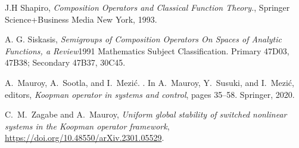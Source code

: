 \documentclass{article}
\begin{document}
\begin{thebibliography}{99}
 J.H Shapiro, \textit{Composition Operators and Classical Function Theory.}, Springer Science+Business Media New York, 1993.

 A. G. Siskasis, \textit{Semigroups of Composition Operators On Spaces of Analytic Functions, a Review}1991 Mathematics Subject Classification. Primary 47D03, 47B38; Secondary 47B37, 30C45.

A.~Mauroy, A.~Sootla, and I.~Mezi{\'c}.
.
\newblock In A.~Mauroy, Y.~Susuki, and I.~Mezi{\'c}, editors, {\em Koopman
  operator in systems and control}, pages 35--58. Springer, 2020.

 C.~M.~Zagabe and A.~Mauroy, \textit{  Uniform global stability of switched nonlinear systems in the Koopman operator framework},  \url{https://doi.org/10.48550/arXiv.2301.05529}.











\end{thebibliography}
\end{document}
